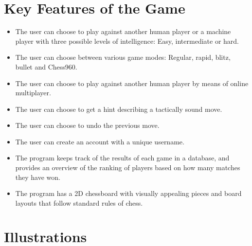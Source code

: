 \documentclass[12pt, a4paper]{article}
\begin{document}
\section{Key Features of the Game}
\begin{itemize}
\item The user can choose to play against another human player or a machine player with three possible levels of intelligence: Easy, intermediate or hard.
\item The user can choose between various game modes: Regular, rapid, blitz, bullet and Chess960.
\item The user can choose to play against another human player by means of online multiplayer.
\item The user can choose to get a hint describing a tactically sound move.
\item The user can choose to undo the previous move.
\item The user can create an account with a unique username.
\item The program keeps track of the results of each game in a database, and provides an overview of the ranking of players based on how many matches they have won.
\item The program has a 2D chessboard with visually appealing pieces and board layouts that follow standard rules of chess.
\end{itemize}

\newpage
\vfill
\section{Illustrations}
\end{document}
